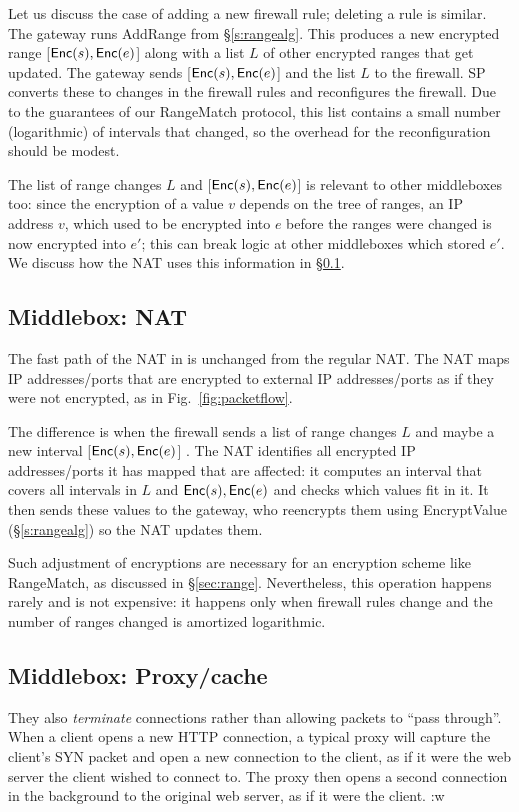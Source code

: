 Let us discuss the case of adding a new firewall rule; deleting a rule is similar.
The gateway runs AddRange from \S\ref{s:rangealg}. This produces a new encrypted range [$\mathsf{Enc}(s), \mathsf{Enc}(e)$] 
along with a list $L$ of other encrypted ranges that get updated. The gateway sends [$\mathsf{Enc}(s), \mathsf{Enc}(e)$] 
 and the list $L$ to the firewall. SP converts these to changes in the firewall rules and 
reconfigures the firewall.  Due to the guarantees of our RangeMatch protocol, this list contains a 
small number (logarithmic) of intervals that changed, so the overhead for the reconfiguration should be modest.
 
The list of range changes $L$ and  [$\mathsf{Enc}(s), \mathsf{Enc}(e)$] 
 is relevant to other middleboxes too: since the encryption of a value $v$ depends on the tree of ranges, an IP address $v$, which used to be encrypted into $e$ before the ranges were changed is now encrypted into $e'$; this can break logic at other middleboxes which stored $e'$. We discuss how the NAT uses this information in \S\ref{sec:nat}.





\subsection{Middlebox: NAT}\label{sec:nat}

The fast path of the NAT in \sys{} is unchanged from the regular NAT. The NAT maps IP addresses/ports that are encrypted to external IP addresses/ports 
as if they were not encrypted, as in Fig.~\ref{fig:packetflow}. 

The difference is  when the firewall sends a list of range changes $L$ and maybe a new interval  [$\mathsf{Enc}(s), \mathsf{Enc}(e)$] .
The NAT identifies all  encrypted IP addresses/ports  it has mapped that are affected: it computes an interval that covers all intervals in $L$ and $\mathsf{Enc}(s), \mathsf{Enc}(e)$ and checks which values fit in it. It then sends these values to the gateway, who reencrypts them using EncryptValue (\S\ref{s:rangealg}) so the NAT updates them. 

Such adjustment of encryptions are necessary for an encryption scheme like RangeMatch, as discussed in \S\ref{sec:range}. Nevertheless, this operation happens rarely and is not expensive: it happens only when firewall rules change and the number of ranges changed is  amortized logarithmic.

\subsection{Middlebox: Proxy/cache}\label{s:proxy}
They also {\it terminate} connections rather than allowing packets to ``pass through''.
When a client opens a new HTTP connection, a typical proxy will capture the client's SYN packet and open a new connection to the client, as if it were the web server the client wished to connect to. 
The proxy then opens a second connection in the background to the original web server, as if it were the client. :w

